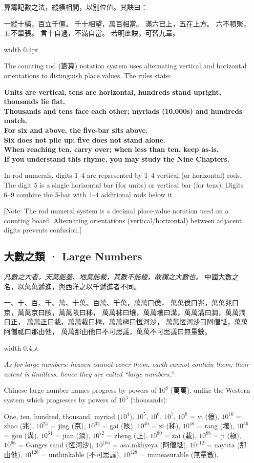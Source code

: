 \documentclass[10pt,a4paper]{article}
\newlength{\cnwidth}
\newlength{\enwidth}
\newcommand{\bilingual}[2]{%
  \noindent%
  \begin{minipage}[t]{\cnwidth}%
    #1%
  \end{minipage}%
  \hfill\vrule width 0.4pt\hfill%
  \begin{minipage}[t]{\enwidth}%
    #2%
  \end{minipage}%
  \par\smallskip%
}
\newcommand{\bilingualsubsection}[2]{%
  \subsection*{#1 · #2}
}
\newcommand{\transnote}[1]{%
  \par\smallskip\noindent\textcolor{notecolor}{\small[Note: #1]}\par\smallskip
}
\begin{document}
\bilingual{%
  算籌記數之法，縱橫相間，以別位值。其訣曰：

  一縱十橫，百立千僵。
  千十相望，萬百相當。
  滿六已上，五在上方。
  六不積聚，五不單張。
  言十自過，不滿自當。
  若明此訣，可習九章。
}{%
  The counting rod (籌算) notation system uses alternating vertical and horizontal
  orientations to distinguish place values. The rules state:

  \textbf{Units are vertical, tens are horizontal, hundreds stand upright, thousands lie flat.}\\
  \textbf{Thousands and tens face each other; myriads (10,000s) and hundreds match.}\\
  \textbf{For six and above, the five-bar sits above.}\\
  \textbf{Six does not pile up; five does not stand alone.}\\
  \textbf{When reaching ten, carry over; when less than ten, keep as-is.}\\
  \textbf{If you understand this rhyme, you may study the Nine Chapters.}

  In rod numerals, digits 1--4 are represented by 1--4 vertical (or horizontal) rods.
  The digit 5 is a single horizontal bar (for units) or vertical bar (for tens).
  Digits 6--9 combine the 5-bar with 1--4 additional rods below it.
}

\transnote{The rod numeral system is a decimal place-value notation used on a counting board.
Alternating orientations (vertical/horizontal) between adjacent digits prevents confusion.}

\bilingualsubsection{大數之類}{Large Numbers}

\bilingual{%
  \textit{凡數之大者，天莫能蓋、地莫能載，其數不能極，故謂之大數也。}
  中國大數之名，以萬萬遞進，與西洋之以千遞進者不同。

  一、十、百、千、萬、十萬、百萬、千萬，萬萬曰億，
  萬萬億曰兆，萬萬兆曰京，萬萬京曰陔，萬萬陔曰秭，
  萬萬秭曰壤，萬萬壤曰溝，萬萬溝曰澗，萬萬澗曰正，
  萬萬正曰載，萬萬載曰極，萬萬極曰恆河沙，
  萬萬恆河沙曰阿僧祗，萬萬阿僧祗曰那由他，
  萬萬那由他曰不可思議，萬萬不可思議曰無量數。
}{%
  \textit{As for large numbers: heaven cannot cover them, earth cannot contain them;
  their extent is limitless, hence they are called ``large numbers.''}

  Chinese large number names progress by powers of $10^8$ (萬萬), unlike the Western
  system which progresses by powers of $10^3$ (thousands):

  One, ten, hundred, thousand, myriad ($10^4$), $10^5$, $10^6$, $10^7$,
  $10^8$ = yi (億), $10^{16}$ = zhao (兆), $10^{24}$ = jing (京),
  $10^{32}$ = gai (陔), $10^{40}$ = zi (秭), $10^{48}$ = rang (壤),
  $10^{56}$ = gou (溝), $10^{64}$ = jian (澗), $10^{72}$ = zheng (正),
  $10^{80}$ = zai (載), $10^{88}$ = ji (極), $10^{96}$ = Ganges sand (恆河沙),
  $10^{104}$ = asa.mkhyeya (阿僧祗), $10^{112}$ = nayuta (那由他),
  $10^{120}$ = unthinkable (不可思議), $10^{128}$ = immeasurable (無量數).
}
\end{document}
